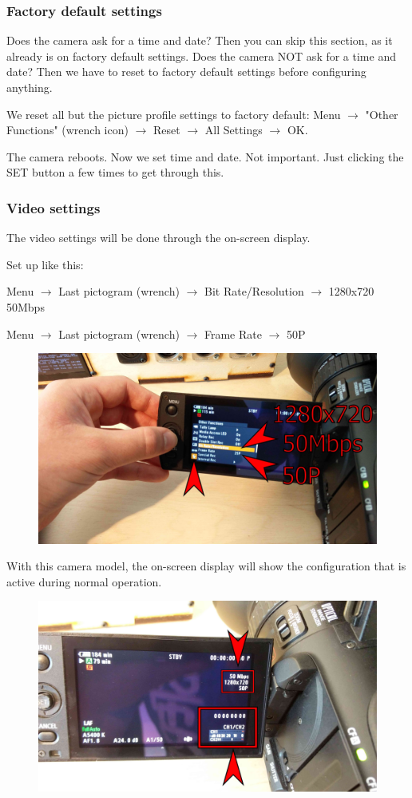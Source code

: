 \documentclass{article}
\begin{document}
\subsubsection{Factory default settings}
Does the camera ask for a time and date? Then you can skip this section, as it already is on factory default settings.
Does the camera NOT ask for a time and date? Then we have to reset to factory default settings before configuring anything.

We reset all but the picture profile settings to factory default:
Menu $\rightarrow$ "Other Functions" (wrench icon) $\rightarrow$ Reset $\rightarrow$ All Settings $\rightarrow$ OK.

The camera reboots. Now we set time and date. Not important. Just clicking the SET button a few times to get through this.


\subsubsection{Video settings}
The video settings will be done through the on-screen display.

Set up like this:

Menu $\rightarrow$ Last pictogram (wrench) $\rightarrow$ Bit Rate/Resolution $\rightarrow$ 1280x720 50Mbps

Menu $\rightarrow$ Last pictogram (wrench) $\rightarrow$ Frame Rate $\rightarrow$ 50P

\begin{figure}[H]
  \centering
\includegraphics[width = 120mm]{Canon05.jpg}
\end{figure}

With this camera model, the on-screen display will show the configuration that is active during normal operation.
\begin{figure}[H]
  \centering
\includegraphics[width = 120mm]{Canon06.jpg}
\end{figure}
\end{document}
